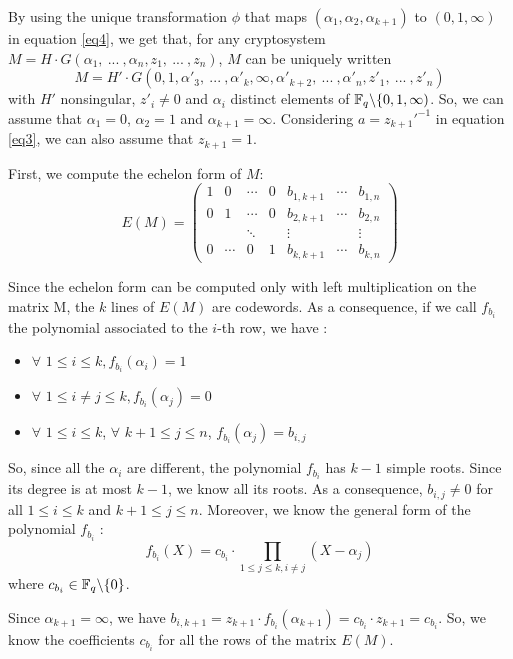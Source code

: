 \documentclass[a4paper]{article}
\begin{document}
By using the unique transformation $\phi$ that maps $(\alpha_1, \alpha_2, \alpha_{k+1})$ to $(0,1,\infty)$ in equation \eqref{eq4}, we get that, for any cryptosystem $M = H\cdot G(\alpha_1, \ ... \ , \alpha_n, z_1, \ ... \ , z_n)$, $M$ can be uniquely written
$$ M = H'\cdot G(0, 1,\alpha'_3, \ ... \ ,\alpha'_k, \infty, \alpha'_{k+2}, \ ... \ , \alpha'_n, z'_1, \ ... \ , z'_n) $$
with $H'$ nonsingular, $z'_i \neq 0$ and $\alpha_i$ distinct elements of $\mathbb{F}_q\backslash\{0, 1, \infty)$.
So, we can assume that $\alpha_1 = 0$, $\alpha_2 = 1$ and $\alpha_{k+1} = \infty$.
Considering $a=z_{k+1}'^{-1}$ in equation \eqref{eq3}, we can also assume that $z_{k+1}=1$.

First, we compute the echelon form of $M$:
$$ E(M) = 
\left(
\begin{array}{ccccccc}
1 & 0 & \cdots & 0 & b_{1,k+1} & \cdots & b_{1,n} \\
0 & 1 & \cdots & 0 & b_{2,k+1} & \cdots & b_{2,n} \\
  &   & \ddots &   & \vdots &   & \vdots \\
0 & \cdots & 0 & 1 & b_{k,k+1} & \cdots & b_{k,n}
\end{array}
\right)
$$

Since the echelon form can be computed only with left multiplication on the matrix M, the $k$ lines of $E(M)$ are codewords. As a consequence, if we call $f_{b_i}$ the polynomial associated to the $i$-th
row, we have :
\begin{itemize}
\item $\forall$  $1\leq i\leq k, f_{b_i}(\alpha_i)=1 $
\item $\forall$  $1\leq i\neq j\leq k, f_{b_i}(\alpha_j)=0 $
\item $\forall$  $1\leq i\leq k$, $\forall$ $k+1\leq j\leq n$, $f_{b_i}(\alpha_j)=b_{i,j} $
\end{itemize}

So, since all the $\alpha_i$ are different, the polynomial $f_{b_i}$ has $k-1$ simple roots. Since its degree is at most $k-1$, we know all its roots. As a consequence, $b_{i,j}\neq0$ for all $1\leq i\leq k$ and $k+1\leq j\leq n$. Moreover, we know the general 
form of the polynomial $f_{b_i}$ :
\begin{equation}
f_{b_i}(X) = c_{b_i}\cdot \prod_{1\leq j\leq k, i\neq j} (X-\alpha_j)
\label{eq5}
\end{equation}
where $c_{b_i} \in \mathbb{F}_q\backslash\{0\}$.

Since $\alpha_{k+1} = \infty$, we have $b_{i,k+1} = z_{k+1}\cdot f_{b_i}(\alpha_{k+1}) = c_{b_i}\cdot z_{k+1} = c_{b_i}$.
So, we know the coefficients $c_{b_i}$ for all the rows of the matrix $E(M)$.
\end{document}
